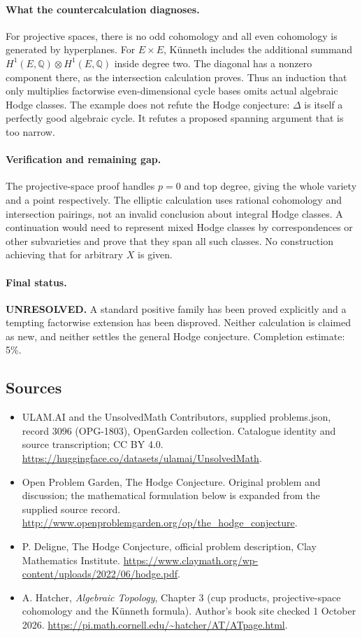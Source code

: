 \documentclass[11pt,a4paper]{article}
\begin{document}
\paragraph{What the countercalculation diagnoses.}
For projective spaces, there is no odd cohomology and all even cohomology is
generated by hyperplanes. For $E\times E$, K\"unneth includes the additional
summand $H^1(E,\mathbb Q)\otimes H^1(E,\mathbb Q)$ inside degree two.
The diagonal has a nonzero component there, as the intersection calculation
proves. Thus an induction that only multiplies factorwise even-dimensional
cycle bases omits actual algebraic Hodge classes. The example does not
refute the Hodge conjecture: $\Delta$ is itself a perfectly good algebraic
cycle. It refutes a proposed spanning argument that is too narrow.

\paragraph{Verification and remaining gap.}
The projective-space proof handles $p=0$ and top degree, giving the whole
variety and a point respectively. The elliptic calculation uses rational
cohomology and intersection pairings, not an invalid conclusion about
integral Hodge classes. A continuation would need to represent mixed Hodge
classes by correspondences or other subvarieties and prove that they span
all such classes. No construction achieving that for arbitrary $X$ is given.

\paragraph{Final status.}
\textbf{UNRESOLVED.} A standard positive family has been proved explicitly
and a tempting factorwise extension has been disproved. Neither calculation
is claimed as new, and neither settles the general Hodge conjecture.
Completion estimate: 5\%.

\subsection{Sources}
\begin{itemize}
\item[S1] ULAM.AI and the UnsolvedMath Contributors, supplied problems.json, record 3096 (OPG-1803), OpenGarden collection. Catalogue identity and source transcription; CC BY 4.0.
\url{https://huggingface.co/datasets/ulamai/UnsolvedMath}.
\item[S2] Open Problem Garden, The Hodge Conjecture. Original problem and discussion; the mathematical formulation below is expanded from the supplied source record.
\url{http://www.openproblemgarden.org/op/the_hodge_conjecture}.
\item[S3] P. Deligne, The Hodge Conjecture, official problem description, Clay Mathematics Institute.
\url{https://www.claymath.org/wp-content/uploads/2022/06/hodge.pdf}.

\item[A1] A. Hatcher, \emph{Algebraic Topology}, Chapter 3 (cup products, projective-space cohomology and the K\"unneth formula). Author's book site checked 1 October 2026. \url{https://pi.math.cornell.edu/~hatcher/AT/ATpage.html}.
\end{itemize}
\end{document}
